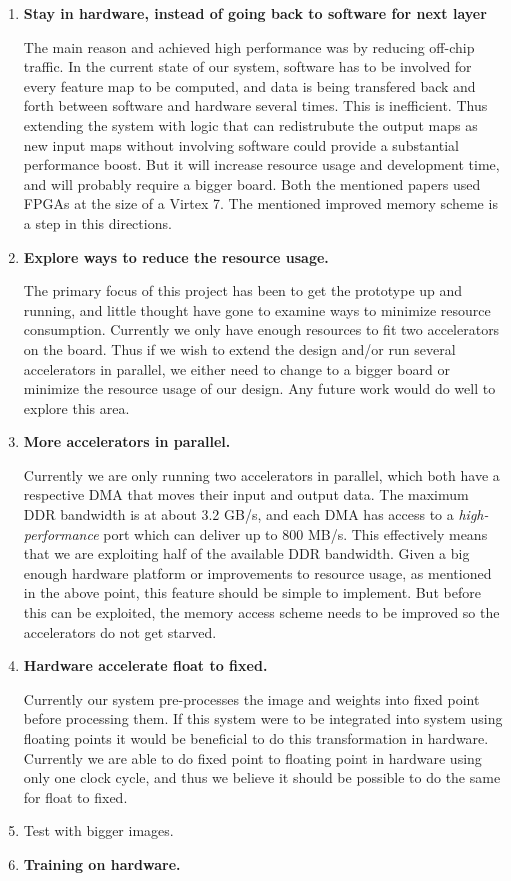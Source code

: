 \begin{enumerate}
  \item \textbf{Stay in hardware, instead of going back to software for next layer}
	
	The main reason \cite{Zhang2015} and \cite{Ovtcharov2015} achieved high performance was by reducing off-chip traffic. In the current state of our system, software has to be involved for every feature map to be computed, and data is being transfered back and forth between software and hardware several times. This is inefficient. Thus extending the system with logic that can redistrubute the output maps as new input maps without involving software could provide a substantial performance boost. But it will increase resource usage and development time, and will probably require a bigger board. Both the mentioned papers used FPGAs at the size of a Virtex 7. The mentioned improved memory scheme is a step in this directions. 
	
	\item \textbf{Explore ways to reduce the resource usage.}
	
	The primary focus of this project has been to get the prototype up and running, and little thought have gone to examine ways to minimize resource consumption. Currently we only have enough resources to fit two accelerators on the board. Thus if we wish to extend the design and/or run several accelerators in parallel, we either need to change to a bigger board or minimize the resource usage of our design. Any future work would do well to explore this area. 
	

	
	\item \textbf{More accelerators in parallel.}
	
	Currently we are only running two accelerators in parallel, which both have a respective DMA that moves their input and output data. The maximum DDR bandwidth is at about 3.2 GB/s, and each DMA has access to a \textit{high-performance} port which can  deliver up to 800 MB/s. This effectively means that we are exploiting half of the available DDR bandwidth. Given a big enough hardware platform or improvements to resource usage, as mentioned in the above point, this feature should be simple to implement. But before this can be exploited, the memory access scheme needs to be improved so the accelerators do not get starved. 
	
	
	
	\item \textbf{Hardware accelerate float to fixed.}
	
	Currently our system pre-processes the image and weights into fixed point before processing them. If this system were to be integrated into system using floating points it would be beneficial to do this transformation in hardware. Currently we are able to do fixed point to floating point in hardware using only one clock cycle, and thus we believe it should be possible to do the same for float to fixed. 

  \item Test with bigger images.

    
	\item \textbf{Training on hardware.}
	
\end{enumerate}
